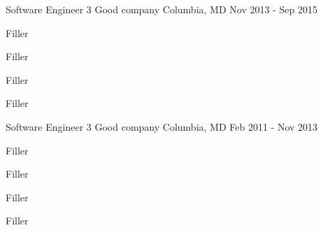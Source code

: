 




\begin{cventries}


\cventry
{Software Engineer 3} %
{Good company} %
{Columbia, MD} %
{Nov 2013 - Sep 2015} %
{\begin{cvitems}
\item {Filler}
\item {Filler}
\item {Filler}
\item {Filler}
\end{cvitems}
}


\cventry
{Software Engineer 3} %
{Good company} %
{Columbia, MD} %
{Feb 2011 - Nov 2013} %
{\begin{cvitems}
\item {Filler}
\item {Filler}
\item {Filler}
\item {Filler}
\end{cvitems}
}




\end{cventries}

